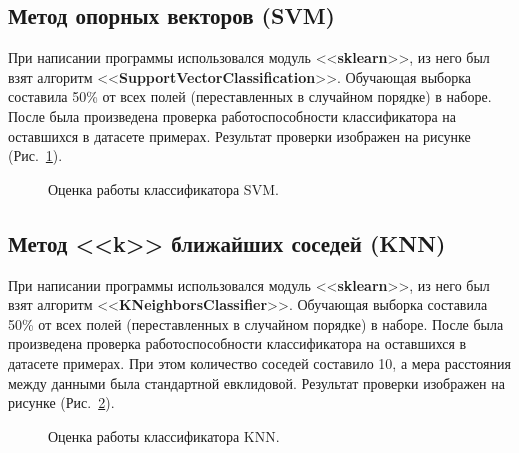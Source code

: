 \documentclass[12pt, a4paper]{article}
\begin{document}
    \subsection{Метод опорных векторов (SVM)}
    
    При написании программы использовался модуль <<\textbf{sklearn}>>, из него был 
    взят алгоритм <<\textbf{SupportVectorClassification}>>. Обучающая выборка 
    составила 50\% от всех полей (переставленных в случайном порядке) в наборе. 
    После была произведена проверка работоспособности классификатора на оставшихся в 
    датасете примерах. Результат проверки изображен на рисунке (Рис.~\ref{image2}).
    
    \begin{figure} [h]
        \caption{Оценка работы классификатора SVM.}
        \label{image2}
    \end{figure}
    
    \subsection{Метод <<k>> ближайших соседей (KNN)}
    
    При написании программы использовался модуль <<\textbf{sklearn}>>, из него был 
    взят алгоритм <<\textbf{KNeighborsClassifier}>>. Обучающая выборка составила 50\% 
    от всех полей (переставленных в случайном порядке) в наборе. После была 
    произведена проверка работоспособности классификатора на оставшихся в датасете 
    примерах. При этом количество соседей составило 10, а мера расстояния между 
    данными была стандартной евклидовой. Результат проверки изображен на рисунке 
    (Рис.~\ref{image3}).
    
    \begin{figure} [h]
        \caption{Оценка работы классификатора KNN.}
        \label{image3}
    \end{figure}
    
\end{document}
